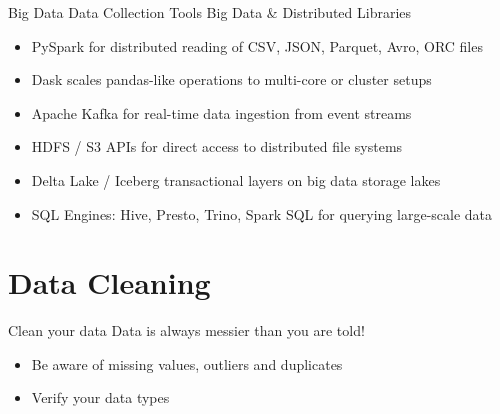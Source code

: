 \documentclass[aspectratio=169]{beamer}
\begin{document}
\begin{frame}[label={sec:orgc519b59}]{Big Data Data Collection Tools}
Big Data \& Distributed Libraries
\begin{itemize}
\item \alert{PySpark} for distributed reading of CSV, JSON, Parquet, Avro, ORC files
\item \alert{Dask} scales pandas-like operations to multi-core or cluster setups
\item \alert{Apache Kafka} for real-time data ingestion from event streams
\item \alert{HDFS / S3 APIs} for direct access to distributed file systems
\item \alert{Delta Lake} / \alert{Iceberg} transactional layers on big data storage lakes
\item \alert{SQL Engines}: \alert{Hive}, \alert{Presto}, \alert{Trino}, \alert{Spark SQL} for querying
large-scale data
\end{itemize}
\end{frame}
\section{Data Cleaning}
\label{sec:org274e2a9}
\begin{frame}[label={sec:orgcd67cd6}]{Clean your data}
\alert{Data is always messier than you are told!}

\begin{itemize}
\item Be aware of missing values, outliers and duplicates
\item Verify your data types
\end{itemize}
\end{frame}
\end{document}
